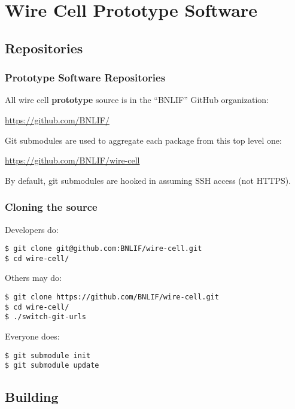 \documentclass[xcolor=dvipsnames]{beamer}
\begin{document}
\section{Wire Cell Prototype Software}

\subsection{Repositories}

\begin{frame}
  \frametitle{Prototype Software Repositories}

  All wire cell \textbf{prototype} source is in the ``BNLIF'' GitHub organization:

  \begin{center}
    \url{https://github.com/BNLIF/}
  \end{center}

  Git submodules are used to aggregate each package from this top level one:

  \begin{center}
    \url{https://github.com/BNLIF/wire-cell}
  \end{center}

  By default, git submodules are hooked in assuming SSH access (not HTTPS).

\end{frame}

\begin{frame}[fragile]
  \frametitle{Cloning the source}
  Developers do:
\begin{verbatim}
$ git clone git@github.com:BNLIF/wire-cell.git
$ cd wire-cell/
\end{verbatim}

  Others may do:
\begin{verbatim}
$ git clone https://github.com/BNLIF/wire-cell.git
$ cd wire-cell/
$ ./switch-git-urls
\end{verbatim}

  Everyone does:

\begin{verbatim}
$ git submodule init
$ git submodule update
\end{verbatim}

\end{frame}

\subsection{Building}
\end{document}
